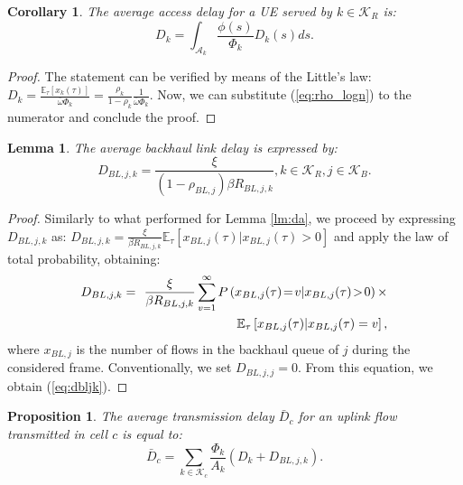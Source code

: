\documentclass[draftcls,onecolumn]{IEEEtran}
\theoremstyle{plain}
\newtheorem{lemma}{Lemma}
\newtheorem{corollary}{Corollary}
\newtheorem{proposition}{Proposition}
\theoremstyle{definition}
\begin{document}
\begin{corollary}
The average access delay for a UE served by $k\in \mathcal{K}_{R}$ is:
\begin{equation}\label{eq:delay_1}
  D_k = \int_{\mathcal{A}_k}\frac{\phi(s)}{\Phi_k}D_k(s){ds}.
\end{equation}
\end{corollary}
\begin{proof}
The statement can be verified by means of the Little's law:
$D_k =   \frac{\mathbb{E}_{\tau}\left[  x_{k}(\tau)   \right]  }{\bar{\omega} \Phi_k }= \frac{\rho_k}{1-\rho_k} \frac{1}{\bar{\omega}\Phi_k}$.
Now, we can substitute (\ref{eq:rho_logn}) to the numerator and conclude the proof.
\end{proof}

\begin{lemma}
The average backhaul link delay is expressed by:
\begin{equation} \label{eq:dbljk}
  D_{BL,j,k}=\frac{\xi}{(1-\rho_{BL,j})\beta R_{BL,j,k}}, k\in \mathcal{K}_R,j\in \mathcal{K}_B.
\end{equation}
\end{lemma}
\begin{proof}
Similarly to what performed for Lemma \ref{lm:da}, we proceed by expressing $D_{BL,j,k}$ as:
$D_{BL,j,k}=\frac{\xi}{\beta R_{BL,j,k}} \mathbb{E}_{\tau}[  x_{BL,j}(\tau) | x_{BL,j}(\tau)>0 ]$ and apply the law of total probability, obtaining: 
\begin{eqnarray} 
            D_{BL,j,k}  &=& \!\! \frac{\xi}{\beta R_{BL,j,k}} \displaystyle \sum_{v=1}^{\infty} P \left(x_{BL,j}(\tau)\!=\!v \middle | x_{BL,j}(\tau)\!>\!0 \right) \times \notag \\
            && \mathbb{E}_{\tau}\left[ x_{BL,j}(\tau) \middle |  x_{BL,j}(\tau)=v \right],\notag 
\end{eqnarray} 
where $x_{BL,j}$ is the number of flows in the backhaul queue of $j$ during the considered frame. Conventionally, we set $D_{BL,j,j}=0$. From this equation, we obtain (\ref{eq:dbljk}).
\end{proof}

\begin{proposition}
The average transmission delay $\bar{D}_c$ for an uplink flow transmitted in cell $c$ is equal to:
\begin{equation} \label{eq:delay}
 \bar{D}_c=\displaystyle \sum_{k \in \mathcal{K}_c}  \frac{\Phi_k}{A_k} (D_k+D_{BL,j,k}).
\end{equation}
\end{proposition}
\end{document}
